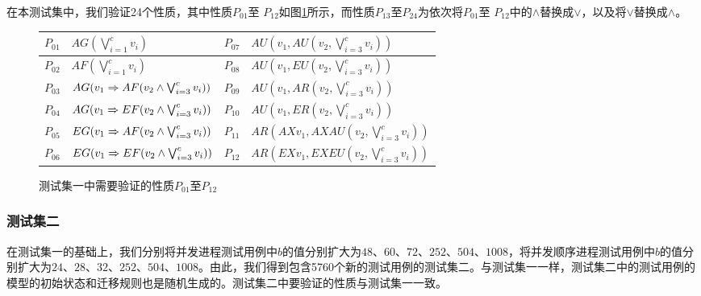 在本测试集中，我们验证24个\CTL{}性质，其中性质$P_{01}$至 $P_{12}$如图\ref{fig:properties}所示，而性质$P_{13}$至$P_{24}$为依次将$P_{01}$至 $P_{12}$中的$\wedge$替换成$\vee$，以及将$\vee$替换成$\wedge$。


\begin{figure}[!h]
	\centering
	{
		\begin{tabular}{|l|l||l|l|}
			\hline
			$P_{01}$& $AG(\bigvee^c_{i=1}v_i)$ & $P_{07}$& $AU(v_1, AU(v_2, \bigvee^c_{i=3}v_i))$\\
			\hline
			$P_{02}$& $AF(\bigvee^c_{i=1}v_i)$ & $P_{08}$ & $AU(v_1, EU(v_2, \bigvee^c_{i=3}v_i))$\\
			\hline
			$P_{03}$& $AG(v_1 \Rightarrow AF(v_2\wedge \bigvee^c_{i=3}v_i))$ & $P_{09}$& $AU(v_1, AR(v_2, \bigvee^c_{i=3}v_i))$\\
			
			\hline
			$P_{04}$& $AG(v_1 \Rightarrow EF(v_2\wedge \bigvee^c_{i=3}v_i))$ & $P_{10}$& $AU(v_1, ER(v_2, \bigvee^c_{i=3}v_i))$\\
			
			\hline
			$P_{05}$& $EG(v_1 \Rightarrow AF(v_2\wedge \bigvee^c_{i=3}v_i))$ & $P_{11}$& $AR(AX v_1, AX AU(v_2, \bigvee^c_{i=3}v_i))$\\
			
			\hline
			$P_{06}$& $EG(v_1 \Rightarrow EF(v_2\wedge \bigvee^c_{i=3}v_i))$ & $P_{12}$& $AR(EX v_1, EX EU(v_2, \bigvee^c_{i=3}v_i))$\\
			
			\hline
		\end{tabular}
	}
	\caption{测试集一中需要验证的性质$P_{01}$至$P_{12}$}
	\label{fig:properties}
\end{figure}

\subsubsection{测试集二}
在测试集一的基础上，我们分别将并发进程测试用例中$b$的值分别扩大为$48$、$60$、$72$、$252$、$504$、$1008$，将并发顺序进程测试用例中$b$的值分别扩大为$24$、$28$、$32$、$252$、$504$、$1008$。由此，我们得到包含5760个新的测试用例的测试集二。与测试集一一样，测试集二中的测试用例的模型的初始状态和迁移规则也是随机生成的。测试集二中要验证的性质与测试集一一致。


